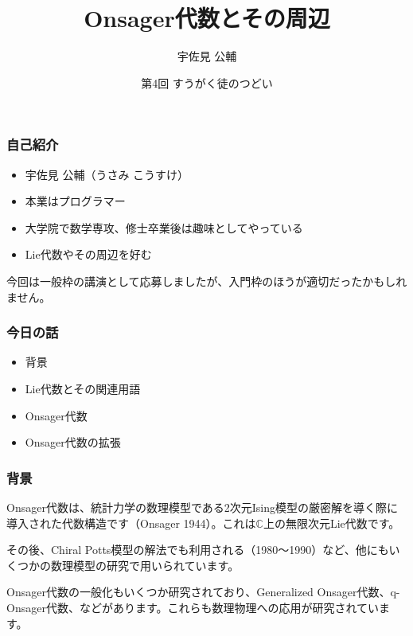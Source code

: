 \documentclass{beamer}
\title{Onsager代数とその周辺}
\author{宇佐見 公輔}
\date{第4回 すうがく徒のつどい}
\begin{document}
\maketitle

\begin{frame}
    \frametitle{自己紹介}

    \begin{itemize}
        \item 宇佐見 公輔（うさみ こうすけ）
        \item 本業はプログラマー
        \item 大学院で数学専攻、修士卒業後は趣味としてやっている
        \item Lie代数やその周辺を好む
    \end{itemize}

    \bigskip

    今回は一般枠の講演として応募しましたが、入門枠のほうが適切だったかもしれません。
\end{frame}

\begin{frame}
    \frametitle{今日の話}

    \begin{itemize}
        \item 背景
        \item Lie代数とその関連用語
        \item Onsager代数
        \item Onsager代数の拡張
    \end{itemize}
\end{frame}

\begin{frame}
    \frametitle{背景}

    Onsager代数は、統計力学の数理模型である2次元Ising模型の厳密解を導く際に導入された代数構造です（Onsager 1944）。これは$ℂ$上の無限次元Lie代数です。

    \bigskip

    その後、Chiral Potts模型の解法でも利用される（1980〜1990）など、他にもいくつかの数理模型の研究で用いられています。

    \bigskip

    Onsager代数の一般化もいくつか研究されており、Generalized Onsager代数、q-Onsager代数、などがあります。これらも数理物理への応用が研究されています。
\end{frame}
\end{document}
